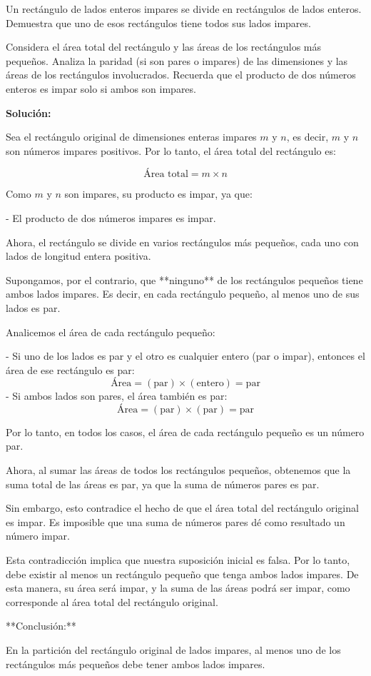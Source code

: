 \documentclass[11pt]{scrartcl}
\begin{document}
\begin{problem}
Un rectángulo de lados enteros impares se divide en rectángulos de lados enteros. Demuestra que uno de esos rectángulos tiene todos sus lados impares.

\begin{hint}
Considera el área total del rectángulo y las áreas de los rectángulos más pequeños. Analiza la paridad (si son pares o impares) de las dimensiones y las áreas de los rectángulos involucrados. Recuerda que el producto de dos números enteros es impar solo si ambos son impares.

\begin{solu}
\textbf{Solución:}

Sea el rectángulo original de dimensiones enteras impares $m$ y $n$, es decir, $m$ y $n$ son números impares positivos. Por lo tanto, el área total del rectángulo es:

$$
\text{Área total} = m \times n
$$

Como $m$ y $n$ son impares, su producto es impar, ya que:

- El producto de dos números impares es impar.

Ahora, el rectángulo se divide en varios rectángulos más pequeños, cada uno con lados de longitud entera positiva.

Supongamos, por el contrario, que **ninguno** de los rectángulos pequeños tiene ambos lados impares. Es decir, en cada rectángulo pequeño, al menos uno de sus lados es par.

Analicemos el área de cada rectángulo pequeño:

- Si uno de los lados es par y el otro es cualquier entero (par o impar), entonces el área de ese rectángulo es par:
  $$
  \text{Área} = (\text{par}) \times (\text{entero}) = \text{par}
  $$
- Si ambos lados son pares, el área también es par:
  $$
  \text{Área} = (\text{par}) \times (\text{par}) = \text{par}
  $$

Por lo tanto, en todos los casos, el área de cada rectángulo pequeño es un número par.

Ahora, al sumar las áreas de todos los rectángulos pequeños, obtenemos que la suma total de las áreas es par, ya que la suma de números pares es par.

Sin embargo, esto contradice el hecho de que el área total del rectángulo original es impar. Es imposible que una suma de números pares dé como resultado un número impar.

Esta contradicción implica que nuestra suposición inicial es falsa. Por lo tanto, debe existir al menos un rectángulo pequeño que tenga ambos lados impares. De esta manera, su área será impar, y la suma de las áreas podrá ser impar, como corresponde al área total del rectángulo original.

**Conclusión:**

En la partición del rectángulo original de lados impares, al menos uno de los rectángulos más pequeños debe tener ambos lados impares.
\end{solu}
\end{hint}
\end{problem}
\end{document}
